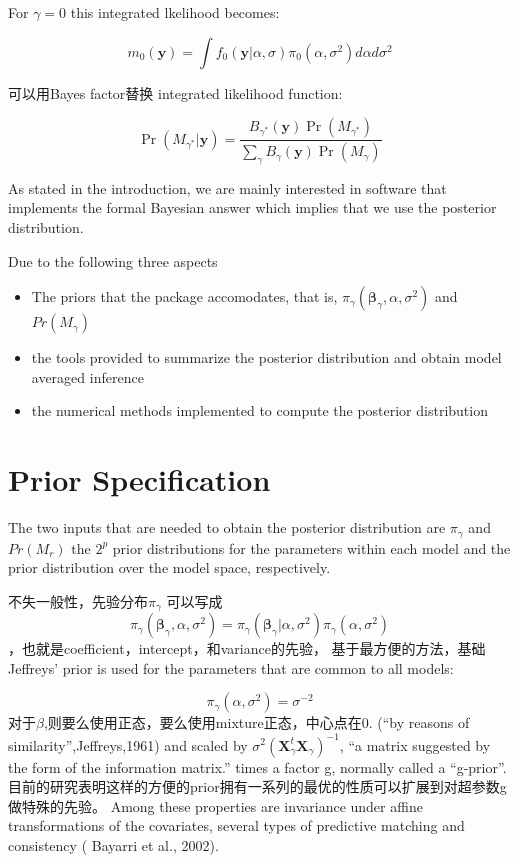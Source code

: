 \documentclass[
]{book}
\theoremstyle{definition}
\theoremstyle{definition}
\theoremstyle{definition}
\theoremstyle{remark}
\begin{document}
For \(\gamma=0\) this integrated lkelihood becomes:

\[
m_{0}(\boldsymbol{y})=\int f_{0}(\boldsymbol{y} | \alpha, \sigma) \pi_{0}\left(\alpha, \sigma^{2}\right) d \alpha d \sigma^{2}
\]

可以用Bayes factor替换 integrated likelihood function:

\[
\operatorname{Pr}\left(M_{\gamma^{*}} | \boldsymbol{y}\right)=\frac{B_{\gamma^{*}}(\boldsymbol{y}) \operatorname{Pr}\left(M_{\gamma^{*}}\right)}{\sum_{\gamma} B_{\gamma}(\boldsymbol{y}) \operatorname{Pr}\left(M_{\gamma}\right)}
\]

As stated in the introduction, we are mainly interested in software that implements the formal Bayesian answer which implies that we use the posterior distribution.

Due to the following three aspects

\begin{itemize}
\item
  The priors that the package accomodates, that is, \(\pi_{\gamma}\left(\boldsymbol{\beta}_{\gamma}, \alpha, \sigma^{2}\right)\) and \(Pr(M_\gamma)\)
\item
  the tools provided to summarize the posterior distribution and obtain model averaged inference
\item
  the numerical methods implemented to compute the posterior distribution
\end{itemize}

\hypertarget{prior-specification}{%
\section{Prior Specification}\label{prior-specification}}

The two inputs that are needed to obtain the posterior distribution are \(\pi_\gamma\) and \(Pr(M_r)\) the \(2^p\) prior distributions for the parameters within each model and the prior distribution over the model space, respectively.

不失一般性，先验分布\(\pi_\gamma\) 可以写成
\[
\pi_{\gamma}\left(\boldsymbol{\beta}_{\gamma}, \alpha, \sigma^{2}\right)=\pi_{\gamma}\left(\boldsymbol{\beta}_{\gamma} | \alpha, \sigma^{2}\right) \pi_{\gamma}\left(\alpha, \sigma^{2}\right)
\]
，也就是coefficient，intercept，和variance的先验，
基于最方便的方法，基础Jeffreys' prior is used for the parameters that are common to all models:

\[
\pi_{\gamma}\left(\alpha, \sigma^{2}\right)=\sigma^{-2}
\]
对于\(\beta\),则要么使用正态，要么使用mixture正态，中心点在0. (``by reasons of similarity'',Jeffreys,1961) and scaled by \(\sigma^{2}\left(\boldsymbol{X}_{\gamma}^{t} \boldsymbol{X}_{\gamma}\right)^{-1}\), ``a matrix suggested by the form of the information matrix.'' times a factor g, normally called a ``g-prior''. 目前的研究表明这样的方便的prior拥有一系列的最优的性质可以扩展到对超参数g做特殊的先验。 Among these properties are invariance under affine transformations of the covariates, several types of predictive matching and consistency ( Bayarri et al., 2002).
\end{document}
